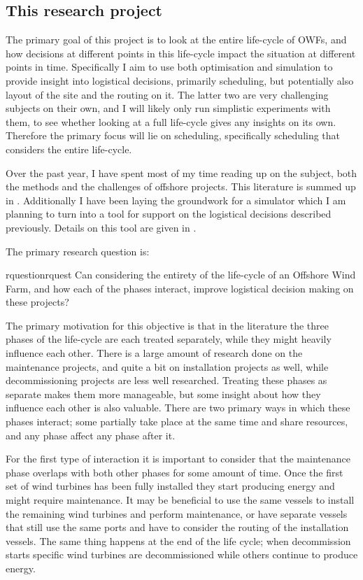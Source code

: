 \documentclass[a4paper,12pt]{article}
\begin{document}
\subsection{This research project} \label{ss:objs}
The primary goal of this project is to look at the entire life-cycle of OWFs, and how decisions at different points in this life-cycle impact the situation at different points in time. Specifically I aim to use both optimisation and simulation to provide insight into logistical decisions, primarily scheduling, but potentially also layout of the site and the routing on it. The latter two are very challenging subjects on their own, and I will likely only run simplistic experiments with them, to see whether looking at a full life-cycle gives any insights on its own. Therefore the primary focus will lie on scheduling, specifically scheduling that considers the entire life-cycle. 

Over the past year, I have spent most of my time reading up on the subject, both the methods and the challenges of offshore projects. This literature is summed up in . Additionally I have been laying the groundwork for a simulator which I am planning to turn into a tool for support on the logistical decisions described previously. Details on this tool are given in .

\bigskip

The primary research question is:

\begin{restatable}{rquestion}{rquest}
Can considering the entirety of the life-cycle of an Offshore Wind Farm, and how each of the phases interact, improve logistical decision making on these projects?
\label{rquest}
\end{restatable}

The primary motivation for this objective is that in the literature the three phases of the life-cycle are each treated separately, while they might heavily influence each other. There is a large amount of research done on the maintenance projects, and quite a bit on installation projects as well, while decommissioning projects are less well researched. Treating these phases as separate makes them more manageable, but some insight about how they influence each other is also valuable. There are two primary ways in which these phases interact; some partially take place at the same time and share resources, and any phase affect any phase after it. 

For the first type of interaction it is important to consider that the maintenance phase overlaps with both other phases for some amount of time. Once the first set of wind turbines has been fully installed they start producing energy and might require maintenance. It may be beneficial to use the same vessels to install the remaining wind turbines and perform maintenance, or have separate vessels that still use the same ports and have to consider the routing of the installation vessels. The same thing happens at the end of the life cycle; when decommission starts specific wind turbines are decommissioned while others continue to produce energy. 
\end{document}
